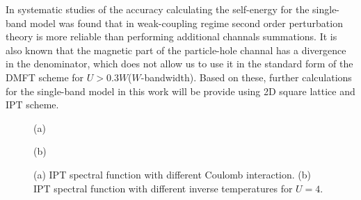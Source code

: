 In \citep{PhysRevB.91.235114} systematic studies of the accuracy calculating the self-energy for the single-band model was found that in weak-coupling regime second order perturbation theory is more reliable than performing additional channals summations. It is also known that the magnetic part of the particle-hole channal has a divergence in the denominator, which does not allow us to use it in the standard form of the DMFT scheme for $U>0.3W$($W$-bandwidth). Based on these, further calculations for the single-band model in this work will be provide using 2D square lattice and IPT scheme. 
\begin{figure}[h!]
\begin{minipage}[h]{0.5\linewidth}
 (a) \\
\end{minipage}
\hfill
\begin{minipage}[h]{0.5\linewidth}
 (b) \\
\end{minipage}
\caption{(a) IPT spectral function with different Coulomb interaction. (b) IPT spectral function with different inverse temperatures for $U=4$.}
\label{Eq_IPT_DOS}
\end{figure}

